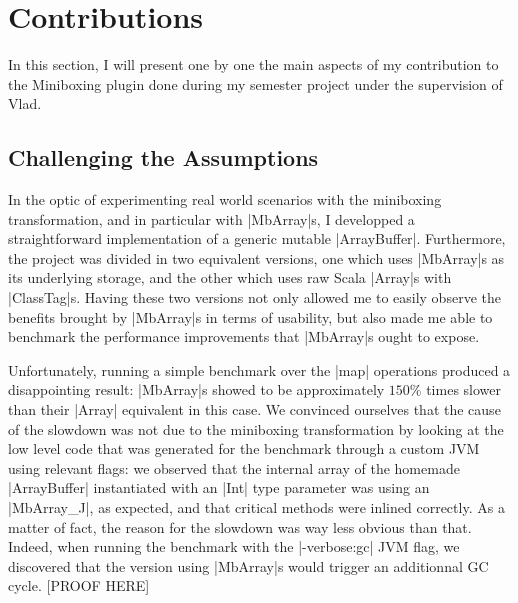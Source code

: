 \section{Contributions}
\label{sec:contrib}

In this section, I will present one by one the main aspects of my contribution to the Miniboxing plugin done during my semester project under the supervision of Vlad.
\subsection{Challenging the Assumptions} 

In the optic of experimenting real world scenarios with the miniboxing transformation, and in particular with |MbArray|s, I developped a straightforward implementation of a generic mutable |ArrayBuffer|. Furthermore, the project was divided in two equivalent versions, one which uses |MbArray|s as its underlying storage, and the other which uses raw Scala |Array|s with |ClassTag|s. Having these two versions not only allowed me to easily observe the benefits brought by |MbArray|s in terms of usability, but also made me able to benchmark the performance improvements that |MbArray|s ought to expose.


Unfortunately, running a simple benchmark over the |map| operations produced a disappointing result: |MbArray|s showed to be approximately $150\%$ times slower than their |Array| equivalent in this case. We convinced ourselves that the cause of the slowdown was not due to the miniboxing transformation by looking at the low level code that was generated for the benchmark through a custom JVM using relevant flags: we observed that the internal array of the homemade |ArrayBuffer| instantiated with an |Int| type parameter was using an |MbArray_J|, as expected, and that critical methods were inlined correctly. As a matter of fact, the reason for the slowdown was way less obvious than that. Indeed, when running the benchmark with the |-verbose:gc| JVM flag, we discovered that the version using |MbArray|s would trigger an additionnal GC cycle. [PROOF HERE]

